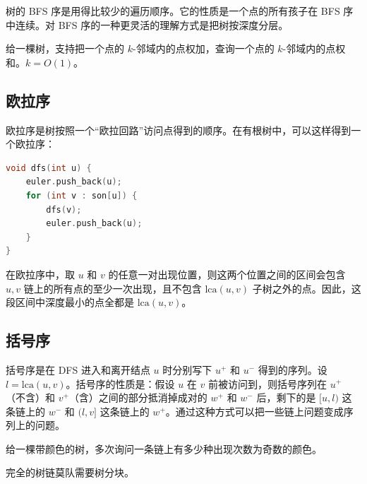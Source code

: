 树的 BFS 序是用得比较少的遍历顺序。它的性质是一个点的所有孩子在 BFS 序中连续。对 BFS 序的一种更灵活的理解方式是把树按深度分层。

\begin{example}[邻域修改查询]
    给一棵树，支持把一个点的 $k$-邻域内的点权加，查询一个点的 $k$-邻域内的点权和。$k=O(1)$。
\end{example}

\subsection{欧拉序}

欧拉序是树按照一个“欧拉回路”访问点得到的顺序。在有根树中，可以这样得到一个欧拉序：
\begin{lstlisting}[language=C++]
void dfs(int u) {
    euler.push_back(u);
    for (int v : son[u]) {
        dfs(v);
        euler.push_back(u);
    }
}
\end{lstlisting}

\begin{property}
    在欧拉序中，取 $u$ 和 $v$ 的任意一对出现位置，则这两个位置之间的区间会包含 $u,v$ 链上的所有点的至少一次出现，且不包含 $\mathrm{lca}(u,v)$ 子树之外的点。因此，这段区间中深度最小的点全都是 $\mathrm{lca}(u,v)$。
\end{property}



\subsection{括号序}

括号序是在 DFS 进入和离开结点 $u$ 时分别写下 $u^+$ 和 $u^-$ 得到的序列。设 $l=\mathrm{lca}(u,v)$。括号序的性质是：假设 $u$ 在 $v$ 前被访问到，则括号序列在 $u^+$（不含）和 $v^+$（含）之间的部分抵消掉成对的 $w^+$ 和 $w^-$ 后，剩下的是 $[u,l)$ 这条链上的 $w^-$ 和 $(l,v]$ 这条链上的 $w^+$。通过这种方式可以把一些链上问题变成序列上的问题。

\begin{example}[括号序树链莫队]
    给一棵带颜色的树，多次询问一条链上有多少种出现次数为奇数的颜色。
\end{example}
\begin{remark}
    完全的树链莫队需要树分块。
\end{remark}

